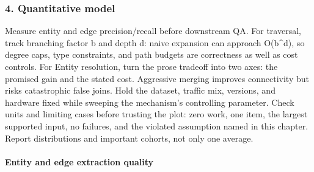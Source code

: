 \subsubsection*{4. Quantitative model}
Measure entity and edge precision/recall before downstream QA. For traversal, track branching factor b and depth d: naive expansion can approach O(b\textasciicircum{}d), so degree caps, type constraints, and path budgets are correctness as well as cost controls.
For Entity resolution, turn the prose tradeoff into two axes: the promised gain and the stated cost. Aggressive merging improves connectivity but risks catastrophic false joins. Hold the dataset, traffic mix, versions, and hardware fixed while sweeping the mechanism's controlling parameter.
Check units and limiting cases before trusting the plot: zero work, one item, the largest supported input, no failures, and the violated assumption named in this chapter. Report distributions and important cohorts, not only one average.
\paragraph{Entity and edge extraction quality}
